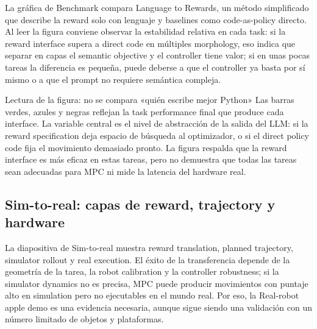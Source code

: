 La gráfica de Benchmark compara Language to Rewards, un método simplificado que describe la reward solo con lenguaje y baselines como code-as-policy directo. Al leer la figura conviene observar la estabilidad relativa en cada task: si la reward interface supera a direct code en múltiples morphology, eso indica que separar en capas el semantic objective y el controller tiene valor; si en unas pocas tareas la diferencia es pequeña, puede deberse a que el controller ya basta por sí mismo o a que el prompt no requiere semántica compleja.


\begin{knowledgebox}{Lectura de la figura: no se compara «quién escribe mejor Python»}
Las barras verdes, azules y negras reflejan la task performance final que produce cada interface. La variable central es el nivel de abstracción de la salida del LLM: si la reward specification deja espacio de búsqueda al optimizador, o si el direct policy code fija el movimiento demasiado pronto. La figura respalda que la reward interface es más eficaz en estas tareas, pero no demuestra que todas las tareas sean adecuadas para MPC ni mide la latencia del hardware real.
\end{knowledgebox}

\subsection{Sim-to-real: capas de reward, trajectory y hardware}

La diapositiva de Sim-to-real muestra reward translation, planned trajectory, simulator rollout y real execution. El éxito de la transferencia depende de la geometría de la tarea, la robot calibration y la controller robustness; si la simulator dynamics no es precisa, MPC puede producir movimientos con puntaje alto en simulation pero no ejecutables en el mundo real. Por eso, la Real-robot apple demo es una evidencia necesaria, aunque sigue siendo una validación con un número limitado de objetos y plataformas.



